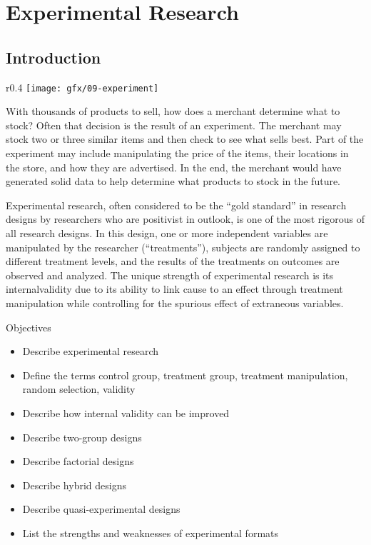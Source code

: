 \chapter{Experimental Research}\label{ch09:experimental_research}

\section{Introduction}

\begin{wrapfigure}{r}{0.4\textwidth}
	\centering
	\texttt{[image: gfx/09-experiment]} 
\end{wrapfigure}

With thousands of products to sell, how does a merchant determine what to stock? Often that decision is the result of an experiment. The merchant may stock two or three similar items and then check to see what sells best. Part of the experiment may include manipulating the price of the items, their locations in the store, and how they are advertised. In the end, the merchant would have generated solid data to help determine what products to stock in the future.

Experimental research, often considered to be the ``gold standard'' in research designs by researchers who are \gls{positivist} in outlook, is one of the most rigorous of all research designs. In this design, one or more independent variables are manipulated by the researcher (``treatments''), subjects are randomly assigned to different treatment levels, and the results of the treatments on outcomes are observed and analyzed. The unique strength of experimental research is its \gls{internalvalidity} due to its ability to link cause to an effect through treatment manipulation while controlling for the spurious effect of extraneous variables.

\begin{center}
	\begin{objbox}{Objectives}
		\begin{itemize}
			\setlength{\itemsep}{0pt}
			\setlength{\parskip}{0pt}
			\setlength{\parsep}{0pt}
			
			\item Describe experimental research
			\item Define the terms control group, treatment group, treatment manipulation, random selection, validity
			\item Describe how internal validity can be improved
			\item Describe two-group designs
			\item Describe factorial designs
			\item Describe hybrid designs
			\item Describe quasi-experimental designs
			\item List the strengths and weaknesses of experimental formats
		\end{itemize}
	\end{objbox}
\end{center}

